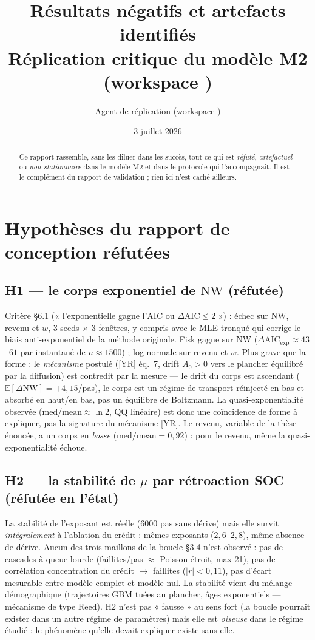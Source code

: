\documentclass[11pt,a4paper]{article}
\title{Résultats négatifs et artefacts identifiés\\
\large Réplication critique du modèle M2 (workspace \code{m2\_fable})}
\author{Agent de réplication (workspace \code{m2\_fable})}
\date{3 juillet 2026}
\newcommand{\NW}{\mathrm{NW}}
\newcommand{\E}{\mathbb{E}}
\begin{document}
\maketitle

\begin{abstract}
Ce rapport rassemble, sans les diluer dans les succès, tout ce qui est
\emph{réfuté}, \emph{artefactuel} ou \emph{non stationnaire} dans le modèle
M2 et dans le protocole qui l'accompagnait. Il est le complément du rapport
de validation ; rien ici n'est caché ailleurs.
\end{abstract}

\section{Hypothèses du rapport de conception réfutées}

\subsection{H1 — le corps exponentiel de $\NW$ (réfutée)}
Critère §6.1 (« l'exponentielle gagne l'AIC ou $\Delta\mathrm{AIC} \le 2$ ») :
échec sur $\NW$, revenu et $w$, 3 seeds $\times$ 3 fenêtres, y compris avec
le MLE tronqué qui corrige le biais anti-exponentiel de la méthode
originale. Fisk gagne sur $\NW$ ($\Delta\mathrm{AIC}_{\exp} \approx 43$--$61$
par instantané de $n \approx 1500$) ; log-normale sur revenu et $w$. Plus
grave que la forme : le \emph{mécanisme} postulé ([YR] éq.~7, drift $A_0>0$
vers le plancher équilibré par la diffusion) est contredit par la mesure —
le drift du corps est ascendant ($\E[\Delta \NW] = +4{,}15$/pas), le corps
est un régime de transport réinjecté en bas et absorbé en haut/en bas, pas
un équilibre de Boltzmann. La quasi-exponentialité observée
($\mathrm{med}/\mathrm{mean} \approx \ln 2$, QQ linéaire) est donc une
coïncidence de forme à expliquer, pas la signature du mécanisme [YR].
Le revenu, variable de la thèse énoncée, a un corps en \emph{bosse}
($\mathrm{med}/\mathrm{mean} = 0{,}92$) : pour le revenu, même la
quasi-exponentialité échoue.

\subsection{H2 — la stabilité de $\mu$ par rétroaction SOC (réfutée en
l'état)}
La stabilité de l'exposant est réelle (6000 pas sans dérive) mais elle
survit \emph{intégralement} à l'ablation du crédit : mêmes exposants
($2{,}6$--$2{,}8$), même absence de dérive. Aucun des trois maillons de la
boucle §3.4 n'est observé : pas de cascades à queue lourde (faillites/pas
$\approx$ Poisson étroit, max 21), pas de corrélation concentration du
crédit $\to$ faillites ($|r| < 0{,}11$), pas d'écart mesurable entre modèle
complet et modèle nul. La stabilité vient du mélange démographique
(trajectoires GBM tuées au plancher, âges exponentiels — mécanisme de type
Reed). H2 n'est pas « fausse » au sens fort (la boucle pourrait exister dans
un autre régime de paramètres) mais elle est \emph{oiseuse} dans le régime
étudié : le phénomène qu'elle devait expliquer existe sans elle.
\end{document}
